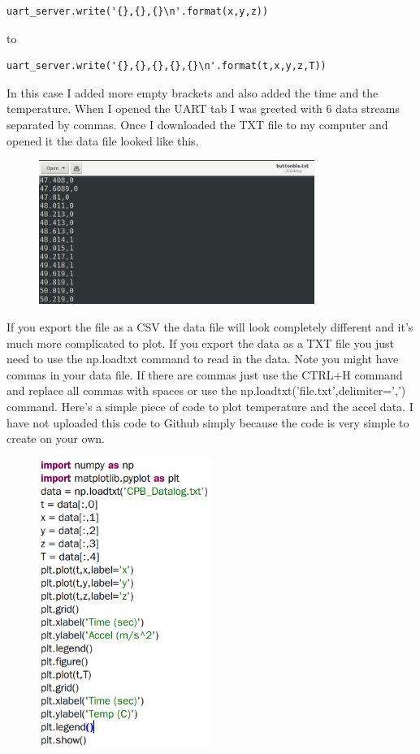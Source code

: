\begin{verbatim}
uart_server.write('{},{},{}\n'.format(x,y,z))
\end{verbatim}
to 
\begin{verbatim}
uart_server.write('{},{},{},{},{}\n'.format(t,x,y,z,T))
\end{verbatim}
In this case I added more empty brackets and also added the time and the temperature. When I opened the UART tab I was greeted with 6 data streams separated by commas. Once I downloaded the TXT file to my computer and opened it the data file looked like this.
\begin{figure}[H]
  \begin{center}
    \includegraphics[width=0.8\textwidth]{Figures/csv_fileapp.png}
  \end{center}
\end{figure}
If you export the file as a CSV the data file will look completely different and it's much more complicated to plot. If you export the data as a TXT file you just need to use the np.loadtxt command to read in the data. Note you might have commas in your data file. If there are commas just use the CTRL+H command and replace all commas with spaces or use the np.loadtxt('file.txt',delimiter=',') command. Here's a simple piece of code to plot temperature and the accel data. I have not uploaded this code to Github simply because the code is very simple to create on your own.
\begin{figure}[H]
  \begin{center}
    \includegraphics[width=0.5\textwidth]{Figures/phoneapp_plotcode.png}
  \end{center}
\end{figure}
